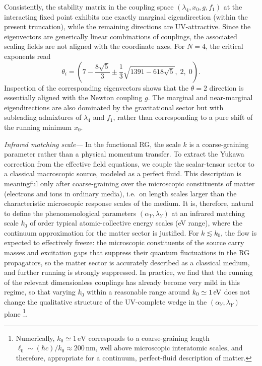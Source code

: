 \documentclass[reprint,superscriptaddress,amsmath,amssymb,aps,prl,floatfix]{revtex4-2}
\def\paragraph#1{
   \textit{#1}
  \unskip
}
\begin{document}
Consistently, the stability matrix in the coupling space $(\lambda_4,x_0,g,f_1)$ at the interacting fixed point exhibits one exactly marginal eigendirection (within the present truncation), while the remaining directions are UV-attractive. Since the eigenvectors are generically linear combinations of couplings, the associated scaling fields are not aligned with the coordinate axes.
For $N=4$, the critical exponents read
\begin{equation}
\theta_i=\left(7-\frac{8\sqrt{5}}{3}\pm\frac{1}{3}\sqrt{1391-618\sqrt{5}},\;2,\;0\right).
\end{equation}
Inspection of the corresponding eigenvectors shows that the $\theta=2$ direction is essentially aligned with the Newton coupling $g$. The marginal and near-marginal eigendirections are also dominated by the gravitational sector but with subleading admixtures of $\lambda_4$ and $f_1$, rather than corresponding to a pure shift of the running minimum $x_0$.

\paragraph{Infrared matching scale—}In the functional RG, the scale $k$ is a coarse-graining parameter rather than a physical momentum transfer. To extract the Yukawa correction from the effective field equations, we couple the scalar-tensor sector to a classical macroscopic source, modeled as a perfect fluid. This description is meaningful only after coarse-graining over the microscopic constituents of matter (electrons and ions in ordinary media), i.e.\ on length scales larger than the characteristic microscopic response scales of the medium. It is, therefore, natural to define the phenomenological parameters $(\alpha_Y,\lambda_Y)$ at an infrared matching scale $k_0$ of order typical atomic-collective energy scales (eV range), where the continuum approximation for the matter sector is justified. For $k\lesssim k_0$, the flow is expected to effectively freeze: the microscopic constituents of the source carry masses and excitation gaps that suppress their quantum fluctuations in the RG propagators, so the matter sector is accurately described as a classical medium, and further running is strongly suppressed. In practice, we find that the running of the relevant dimensionless couplings has already become very mild in this regime, so that varying $k_0$ within a reasonable range around $k_0\simeq 1\,{\rm eV}$ does not change the qualitative structure of the UV-complete wedge in the $(\alpha_Y,\lambda_Y)$ plane \footnote{Numerically, $k_0\simeq 1\,\mathrm{eV}$ corresponds to a coarse-graining length $\ell_0\sim (\hbar c)/k_0 \approx 200\,\mathrm{nm}$, well above microscopic interatomic scales, and therefore, appropriate for a continuum, perfect-fluid description of matter.}.
\end{document}
